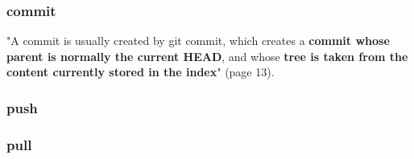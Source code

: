 \subsubsection{commit}

"A commit is usually created by git commit, which creates a {\bf commit whose parent is 
normally the current HEAD}, and whose {\bf tree is taken from the content currently stored
in the index}" \cite{gitComm} (page 13).


\subsubsection{push}

\subsubsection{pull}
